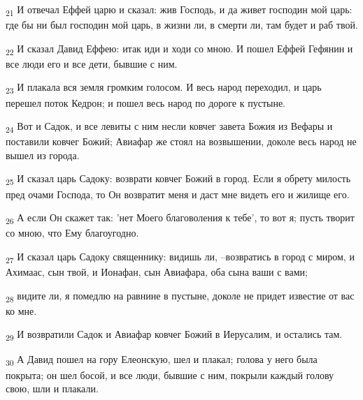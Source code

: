 \begin{tcolorbox}
\textsubscript{21} И отвечал Еффей царю и сказал: жив Господь, и да живет господин мой царь: где бы ни был господин мой царь, в жизни ли, в смерти ли, там будет и раб твой.
\end{tcolorbox}
\begin{tcolorbox}
\textsubscript{22} И сказал Давид Еффею: итак иди и ходи со мною. И пошел Еффей Гефянин и все люди его и все дети, бывшие с ним.
\end{tcolorbox}
\begin{tcolorbox}
\textsubscript{23} И плакала вся земля громким голосом. И весь народ переходил, и царь перешел поток Кедрон; и пошел весь народ по дороге к пустыне.
\end{tcolorbox}
\begin{tcolorbox}
\textsubscript{24} Вот и Садок, и все левиты с ним несли ковчег завета Божия из Вефары и поставили ковчег Божий; Авиафар же стоял на возвышении, доколе весь народ не вышел из города.
\end{tcolorbox}
\begin{tcolorbox}
\textsubscript{25} И сказал царь Садоку: возврати ковчег Божий в город. Если я обрету милость пред очами Господа, то Он возвратит меня и даст мне видеть его и жилище его.
\end{tcolorbox}
\begin{tcolorbox}
\textsubscript{26} А если Он скажет так: 'нет Моего благоволения к тебе', то вот я; пусть творит со мною, что Ему благоугодно.
\end{tcolorbox}
\begin{tcolorbox}
\textsubscript{27} И сказал царь Садоку священнику: видишь ли, --возвратись в город с миром, и Ахимаас, сын твой, и Ионафан, сын Авиафара, оба сына ваши с вами;
\end{tcolorbox}
\begin{tcolorbox}
\textsubscript{28} видите ли, я помедлю на равнине в пустыне, доколе не придет известие от вас ко мне.
\end{tcolorbox}
\begin{tcolorbox}
\textsubscript{29} И возвратили Садок и Авиафар ковчег Божий в Иерусалим, и остались там.
\end{tcolorbox}
\begin{tcolorbox}
\textsubscript{30} А Давид пошел на гору Елеонскую, шел и плакал; голова у него была покрыта; он шел босой, и все люди, бывшие с ним, покрыли каждый голову свою, шли и плакали.
\end{tcolorbox}
